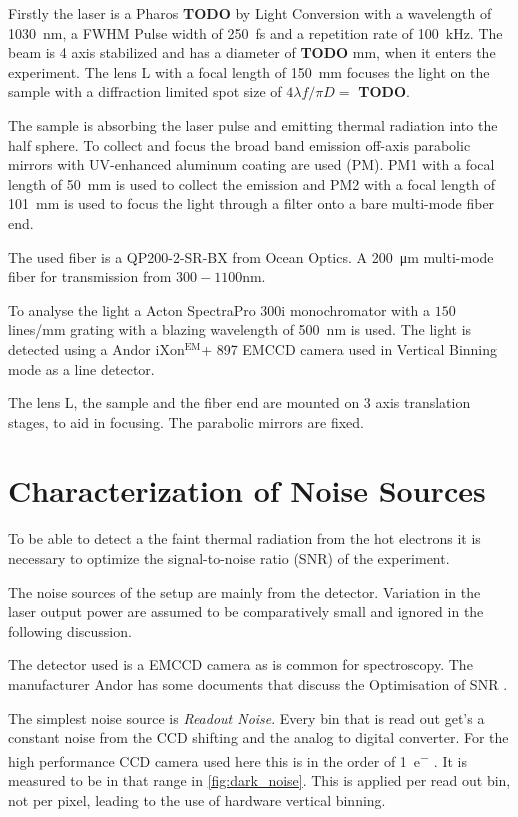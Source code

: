 \documentclass[
	parskip=half,
	a4paper,
]{scrarticle}
\begin{document}
Firstly the laser is a Pharos \textbf{TODO} by Light Conversion with a wavelength of \SI{1030}{nm}, a FWHM Pulse width of \SI{250}{fs} and a repetition rate of \SI{100}{kHz}.
The beam is 4 axis stabilized and has a diameter of \textbf{TODO} \si{mm}, when it enters the experiment.
The lens \textsf{L} with a focal length of \SI{150}{mm} focuses the light on the sample with a diffraction limited spot size of $4 \lambda f / \pi D = $ \textbf{TODO}.

The sample is absorbing the laser pulse and emitting thermal radiation into the half sphere.
To collect and focus the broad band emission off-axis parabolic mirrors with  UV-enhanced aluminum coating are used (\textsf{PM}).
\textsf{PM1} with a focal length of \SI{50}{mm} is used to collect the emission and \textsf{PM2} with a focal length of \SI{101}{mm} is used to focus the light through a filter onto a bare multi-mode fiber end.

The used fiber is a QP200-2-SR-BX from Ocean Optics. A \SI{200}{\micro m} multi-mode fiber for transmission from $300-1100$\;\si{nm}.

To analyse the light a Acton SpectraPro 300i monochromator with a $150$\;lines/mm grating with a blazing wavelength of \SI{500}{nm} is used.
The light is detected using a Andor iXon$^\text{EM}$+ 897 EMCCD camera used in Vertical Binning mode as a line detector.

The lens \textsf{L}, the sample and the fiber end are mounted on 3 axis translation stages, to aid in focusing. The parabolic mirrors are fixed.

\clearpage
\section{Characterization of Noise Sources}
To be able to detect a the faint thermal radiation from the hot electrons it is necessary to optimize the signal-to-noise ratio (SNR) of the experiment.

The noise sources of the setup are mainly from the detector.
Variation in the laser output power are assumed to be comparatively small and ignored in the following discussion.

The detector used is a EMCCD camera as is common for spectroscopy. The manufacturer Andor has some documents that discuss the Optimisation of SNR \cite{andor_establishing_nodate,dr_jo_walters_sensitivity_2023}.

The simplest noise source is \textit{Readout Noise}. Every bin that is read out get's a constant noise from the CCD shifting and the analog to digital converter. For the high performance CCD camera used here this is in the order of \SI{1}{e^-} \cite{andor_ixonem_nodate}. It is measured to be in that range in \autoref{fig:dark_noise}.
This is applied per read out bin, not per pixel, leading to the use of hardware vertical binning.
\end{document}
